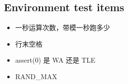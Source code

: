 \subsection{Environment test items}

\begin{itemize}
    \item 一秒运算次数，带模一秒跑多少
    \item 行末空格
    \item assert(0) 是 WA 还是 TLE
    \item RAND\_MAX
\end{itemize}
